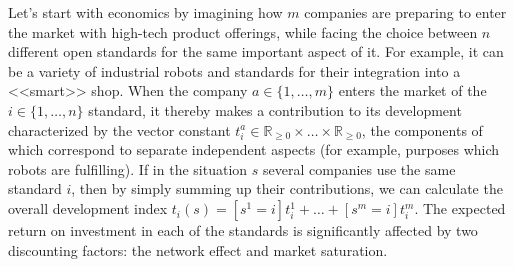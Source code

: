 Let's start with economics by imagining how $m$ companies are preparing to enter the market with high-tech product offerings, while facing the choice between $n$ different open standards for the same important aspect of it. For example, it can be a variety of industrial robots and standards for their integration into a <<smart>> shop. When the company $a \in \{1, \ldots, m\}$ enters the market of the $i \in \{1, \ldots, n\}$ standard, it thereby makes a contribution to its development characterized by the vector constant $t_i^a \in \mathbb{R}_{\ge 0} \times \ldots \times \mathbb{R}_{\ge 0}$, the components of which correspond to separate independent aspects (for example, purposes which robots are fulfilling). If in the situation $s$ several companies use the same standard $i$, then by simply summing up their contributions, we can calculate the overall development index $t_i(s) = [s^1 = i] t_i^1 + \ldots + [s^m = i] t_i^m$. The expected return on investment in each of the standards is significantly affected by two discounting factors: the network effect and market saturation. %


